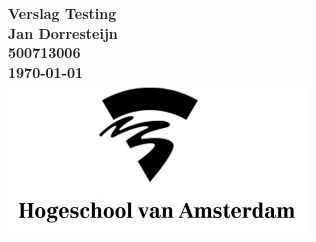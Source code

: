 \begin{titlepage}
  \centering
    \vfill
    {\bfseries\Huge
      Verslag Testing\\
        \vskip2cm
      }
      {\bfseries\Large
       Jan Dorresteijn  \\
      }
      {
        \bfseries\normalsize
        500713006\\
        \vskip1cm
        \today\\
    }    
    \vfill
    \includegraphics[height=4cm]{images/hva-logo-png-7.png} %
    \vfill
    \vfill
\end{titlepage}
\newpage